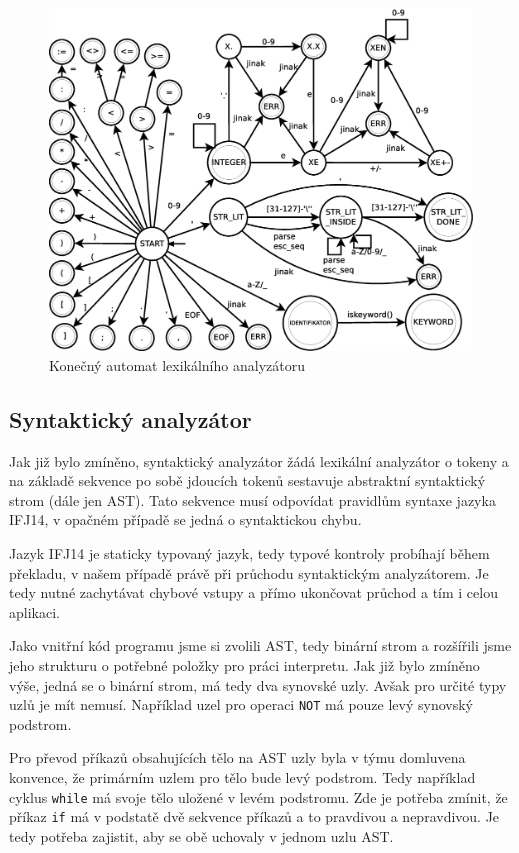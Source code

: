 \documentclass[12pt,a4paper,titlepage,final]{article}
\begin{document}
\begin{figure}[h!]\label{lex_ka}
	\centering
		\includegraphics[width=\textwidth]{img/KA-scanner.eps}
	\caption{Konečný automat lexikálního analyzátoru}
\end{figure}
\pagebreak

\subsection{Syntaktický analyzátor} \label{syntakticky_analyzator}
Jak již bylo zmíněno, syntaktický analyzátor žádá lexikální analyzátor o tokeny
a na základě sekvence po sobě jdoucích tokenů sestavuje abstraktní syntaktický
strom (dále jen AST). Tato sekvence musí odpovídat pravidlům syntaxe jazyka IFJ14,
v opačném případě se jedná o syntaktickou chybu.

Jazyk IFJ14 je staticky typovaný jazyk, tedy typové kontroly probíhají během 
překladu, v našem případě právě při průchodu syntaktickým analyzátorem. Je tedy
nutné zachytávat chybové vstupy a přímo ukončovat průchod a tím i celou aplikaci.

Jako vnitřní kód programu jsme si zvolili AST, tedy binární strom a rozšířili jsme
jeho strukturu o potřebné položky pro práci interpretu. Jak již bylo zmíněno výše,
jedná se o binární strom, má tedy dva synovské uzly. Avšak pro určité typy uzlů
je mít nemusí. Například uzel pro operaci \verb|NOT| má pouze levý synovský podstrom.

Pro převod příkazů obsahujících tělo na AST uzly byla v týmu domluvena konvence,
že primárním uzlem pro tělo bude levý podstrom. Tedy například cyklus \verb|while|
má svoje tělo uložené v levém podstromu. Zde je potřeba zmínit, že příkaz \verb|if|
má v podstatě dvě sekvence příkazů a to pravdivou a nepravdivou. Je tedy potřeba
zajistit, aby se obě uchovaly v jednom uzlu AST.
\end{document}
